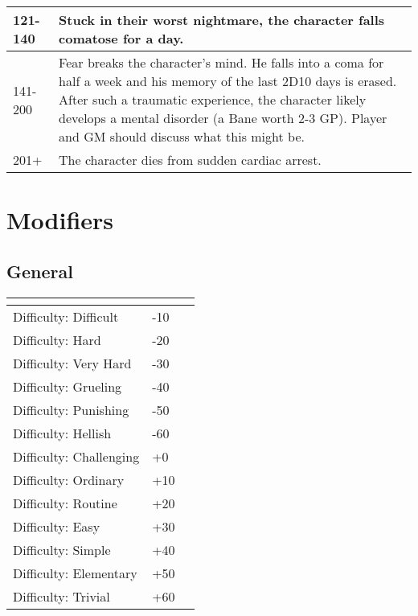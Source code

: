 \documentclass[12pt,a4paper,openany]{book}
\newcommand{\ul}[1]{\underline{\smash{#1}}}
\begin{document}
\begin{tabularx}{\textwidth}{|l|X|}
		121-140 & Stuck in their worst nightmare, the character falls comatose for a day.                                                                                                                                                                                                                                                                                                           \\ \hline
		141-200 & Fear breaks the character’s mind. He falls into a coma for half a week and his memory of the last 2D10 days is erased. After such a traumatic experience, the character likely develops a mental disorder (a Bane worth 2-3 GP). Player and GM should discuss what this might be.                                                                                                    \\ \hline
		201+    & The character dies from sudden cardiac arrest.                                                                                                                                                                                                                                                                                                                                       \\ \hline
	\end{tabularx}
	\section{Modifiers}
	\label{situationalmodifiers}
	\subsection{General}
	\begin{center}
	\begin{tabular}{|l|l|l|}
		\hline
		\ul{Situation}         & \ul{Modifier} \\ \hline
		Difficulty: Difficult   & -10            \\ \hline
		Difficulty: Hard        & -20            \\ \hline
		Difficulty: Very Hard   & -30            \\ \hline
		Difficulty: Grueling    & -40            \\ \hline
		Difficulty: Punishing   & -50            \\ \hline
		Difficulty: Hellish     & -60            \\ \hline
		Difficulty: Challenging & +0             \\ \hline
		Difficulty: Ordinary    & +10            \\ \hline
		Difficulty: Routine     & +20            \\ \hline
		Difficulty: Easy        & +30            \\ \hline
		Difficulty: Simple      & +40            \\ \hline
		Difficulty: Elementary  & +50            \\ \hline
		Difficulty: Trivial     & +60            \\ \hline
	\end{tabular}
	\end{center}
\end{document}
